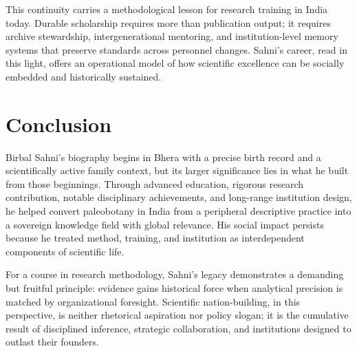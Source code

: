 \documentclass[10pt]{article}
\begin{document}
This continuity carries a methodological lesson for research training in India today. Durable scholarship requires more than publication output; it requires archive stewardship, intergenerational mentoring, and institution-level memory systems that preserve standards across personnel changes. Sahni's career, read in this light, offers an operational model of how scientific excellence can be socially embedded and historically sustained.\cite{bsip_history,recent_developments,science_state_nation}

\section*{Conclusion}
Birbal Sahni's biography begins in Bhera with a precise birth record and a scientifically active family context, but its larger significance lies in what he built from those beginnings. Through advanced education, rigorous research contribution, notable disciplinary achievements, and long-range institution design, he helped convert paleobotany in India from a peripheral descriptive practice into a sovereign knowledge field with global relevance. His social impact persists because he treated method, training, and institution as interdependent components of scientific life.\cite{wiki_birbal,ias_memorial,from_lahore_lucknow,bsip_history}

For a course in research methodology, Sahni's legacy demonstrates a demanding but fruitful principle: evidence gains historical force when analytical precision is matched by organizational foresight. Scientific nation-building, in this perspective, is neither rhetorical aspiration nor policy slogan; it is the cumulative result of disciplined inference, strategic collaboration, and institutions designed to outlast their founders.\cite{science_state_nation,trans_himalayan_article,isti_bsip}
\end{document}
